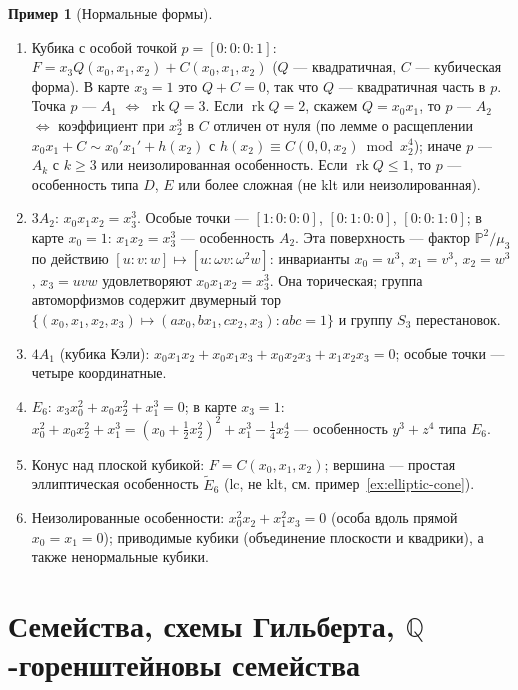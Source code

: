 \documentclass[11pt,a4paper]{article}
\theoremstyle{plain}
\theoremstyle{definition}
\newtheorem{example}[theorem]{Пример}
\theoremstyle{remark}
\newcommand{\Q}{\mathbb{Q}}
\newcommand{\PP}{\mathbb{P}}
\DeclareMathOperator{\rk}{rk}
\begin{document}
\begin{example}[Нормальные формы]\label{ex:cubic-normal-forms}
\begin{enumerate}
\item Кубика с особой точкой $p=[0:0:0:1]$: $F=x_3Q(x_0,x_1,x_2)+C(x_0,x_1,x_2)$ ($Q$ ---
квадратичная, $C$ --- кубическая форма). В карте $x_3=1$ это $Q+C=0$, так что $Q$ --- квадратичная
часть в $p$. Точка $p$ --- $A_1$ $\iff$ $\rk Q=3$. Если $\rk Q=2$, скажем $Q=x_0x_1$, то $p$ ---
$A_2$ $\iff$ коэффициент при $x_2^3$ в $C$ отличен от нуля (по лемме о расщеплении
$x_0x_1+C\sim x_0'x_1'+h(x_2)$ с $h(x_2)\equiv C(0,0,x_2)\bmod x_2^4$); иначе $p$ --- $A_k$ с
$k\ge3$ или неизолированная особенность. Если $\rk Q\le1$, то $p$ --- особенность типа $D$, $E$
или более сложная (не klt или неизолированная).
\item $3A_2$: $x_0x_1x_2=x_3^3$. Особые точки --- $[1:0:0:0]$, $[0:1:0:0]$, $[0:0:1:0]$; в карте
$x_0=1$: $x_1x_2=x_3^3$ --- особенность $A_2$. Эта поверхность --- фактор $\PP^2/\mu_3$ по действию
$[u:v:w]\mapsto[u:\omega v:\omega^2w]$: инварианты $x_0=u^3$, $x_1=v^3$, $x_2=w^3$, $x_3=uvw$
удовлетворяют $x_0x_1x_2=x_3^3$. Она торическая; группа автоморфизмов содержит двумерный тор
$\{(x_0,x_1,x_2,x_3)\mapsto(ax_0,bx_1,cx_2,x_3): abc=1\}$ и группу $S_3$ перестановок.
\item $4A_1$ (кубика Кэли): $x_0x_1x_2+x_0x_1x_3+x_0x_2x_3+x_1x_2x_3=0$; особые точки --- четыре
координатные.
\item $E_6$: $x_3x_0^2+x_0x_2^2+x_1^3=0$; в карте $x_3=1$: $x_0^2+x_0x_2^2+x_1^3=
(x_0+\tfrac12x_2^2)^2+x_1^3-\tfrac14x_2^4$ --- особенность $y^3+z^4$ типа $E_6$.
\item Конус над плоской кубикой: $F=C(x_0,x_1,x_2)$; вершина --- простая эллиптическая особенность
$\tilde E_6$ (lc, не klt, см. пример~\ref{ex:elliptic-cone}).
\item Неизолированные особенности: $x_0^2x_2+x_1^2x_3=0$ (особа вдоль прямой $x_0=x_1=0$);
приводимые кубики (объединение плоскости и квадрики), а также ненормальные кубики.
\end{enumerate}
\end{example}

\section{Семейства, схемы Гильберта, \texorpdfstring{$\Q$}{Q}-горенштейновы семейства}\label{sec:families}
\end{document}
